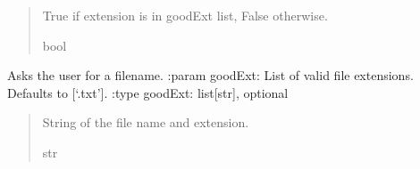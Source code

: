 \documentclass[letterpaper,10pt,english]{sphinxmanual}
\begin{document}
\begin{fulllineitems}
\begin{fulllineitems}
\begin{quote}
\begin{description}
\begin{itemize}
\end{itemize}

\sphinxAtStartPar
True if extension is in goodExt list, False otherwise.

\sphinxAtStartPar
bool

\end{description}\end{quote}

\end{fulllineitems}


\begin{fulllineitems}
\label{\detokenize{GetUserInput:GetUserInput.UserInput.GetFileName}}
\pysigstartsignatures
{}
\pysigstopsignatures
\sphinxAtStartPar
Asks the user for a filename.
:param goodExt: List of valid file extensions. Defaults to {[}‘.txt’{]}.
:type goodExt: list{[}str{]}, optional
\begin{quote}\begin{description}
\sphinxAtStartPar
String of the file name and extension.

\sphinxAtStartPar
str

\end{description}\end{quote}

\end{fulllineitems}



\end{fulllineitems}
\end{document}
